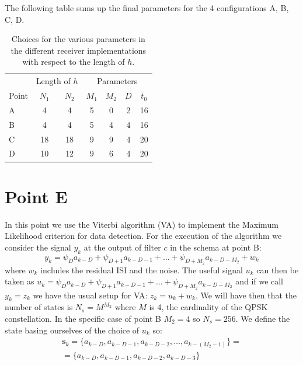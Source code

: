 \documentclass[a4paper,11.5pt]{article}
\newcommand{\vt}{\boldsymbol}
\begin{document}
The following table sums up the final parameters for the 4 configurations A, B, C, D.

\begin{table}[htbp]
	\begin{center}
		\begin{tabular}{p{2.7cm}cccccc}
			\toprule
			& \multicolumn{2}{c}{Length of $h$} & \multicolumn{4}{c}{Parameters} \\
			\cmidrule(lr){2-3}
			\cmidrule(lr){4-7}
			Point & $N_1$ & $N_2$ & $M_1$ & $M_2$ & $D$ & $\bar{t}_0$ \\
			\midrule
			A &  4  &  4  & 5 & 0  & 2 & 16 \\
			B &  4  &  4  & 5 & 4  & 4 & 16 \\
			C & 18  &  18 & 9 & 9 & 4 & 20 \\
			D & 10  &  12 & 9 & 6 & 4 & 20 \\
			\bottomrule
		\end{tabular}
	\end{center}
	\label{tab:sumup}
	\caption{Choices for the various parameters in the different receiver implementations with respect to the length of $h$.}
\end{table} 

\section*{Point E}

In this point we use the Viterbi algorithm (VA) to implement the Maximum Likelihood criterion for data detection. 
For the execution of the algorithm we consider the signal $y_k$ at the output of filter $c$ in the schema at point B:
\begin{equation}
y_k = \psi_D a_{k-D} + \psi_{D+1} a_{k-D-1} + \dots +\psi_{D+M_2} a_{k-D-M_2} + w_k
\end{equation}
where $w_k$ includes the residual ISI and the noise. The useful signal $u_k$ can then be taken as $u_k=\psi_D a_{k-D} + \psi_{D+1} a_{k-D-1} + \dots +\psi_{D+M_2} a_{k-D-M_2}$ and if we call $y_k=z_k$ we have the usual setup for VA: $z_k = u_k+w_k$. We will have then that the number of states is $N_s=M^{M_2}$ where $M$ is 4, the cardinality of the QPSK constellation. In the specific case of point B $M_2=4$ so $N_s=256$. We define the state basing ourselves of the choice of $u_k$ so:
\begin{equation}
\begin{split}
\vt{s}_k = \{a_{k-D}, a_{k-D-1}, a_{k-D-2}, \dots, a_{k-(M_2-1)}\} = \\
= \{a_{k-D}, a_{k-D-1}, a_{k-D-2}, a_{k-D-3}\}
\end{split}
\end{equation}
\end{document}
